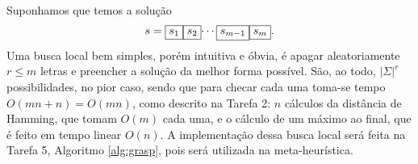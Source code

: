 Suponhamos que temos a solução
\[s = \text{\fbox{$s_1$}\fbox{$s_2$}$\cdots$\fbox{$s_{m-1}$}\fbox{$s_m$}}.\]
Uma busca local bem simples, porém intuitiva e óbvia, é apagar aleatoriamente $r \le m$ letras e preencher a solução da melhor forma possível. São, ao todo, $|\Sigma|^r$ possibilidades, no pior caso, sendo que para checar cada uma toma-se tempo $O(mn+n) = O(mn)$, como descrito na Tarefa 2: $n$ cálculos da distância de Hamming, que tomam $O(m)$ cada uma, e o cálculo de um máximo ao final, que é feito em tempo linear $O(n)$.
A implementação dessa busca local será feita na Tarefa 5, Algoritmo \ref{alg:grasp}, pois será utilizada na meta-heurística.
